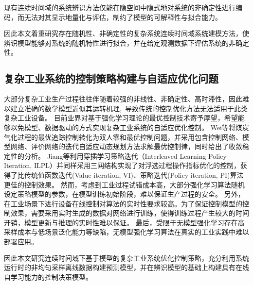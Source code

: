 现有连续时间域的系统辨识方法仅能在隐空间中隐式地对系统的非确定性进行编码，而无法对其显示地量化与评估，制约了模型的可解释性与拟合能力。

因此本文着重研究存在随机性、非确定性的复杂系统连续时间域系统建模方法，使辨识模型能够对系统的随机特性进行拟合，并在给定观测数据下评估系统的非确定性。

\subsection{复杂工业系统的控制策略构建与自适应优化问题}
大部分复杂工业生产过程往往伴随着较强的非线性、非确定性、高时滞性，因此难以建立准确的数学模型近似其运转机理, 导致传统的控制优化方法无法适用于此类复杂工业设备。
目前业界对基于强化学习理论的最优控制技术\cite{Sutton2018}\cite{F.L.LewisD.Vrabie2012}寄予厚望，希望能够以免模型、数据驱动的方式实现复杂工业系统的自适应优化控制。
Wei等\cite{Wei2014}将煤炭气化过程的最优追踪控制转化为双人零和最优控制问题，并采用包含控制网络、模型网络、评价网络的迭代自适应动态规划方法求解最优控制律，同时给出了收敛稳定性的分析。
Jiang等\cite{Jiang2018}利用穿插学习策略迭代（Interleaved Learning
Policy Iteration, ILPL）并同样采用三网结构实现了对浮选过程操作指标优化的控制，获得了比传统值函数迭代(Value iteration, VI)、策略迭代(Policy iteration, PI)算法更佳的控制效果。
然而，考虑到工业过程试错成本高，大部分强化学习算法随机设定策略模型的参数，在模型训练初始阶段，难以保证生产过程的安全。
另外，在工业场景下进行设备在线控制对算法的实时性要求较高。为了保证控制模型的控制效果，需要采用实时生成的数据对网络进行训练，使得训练过程产生较大的时间开销，模型更新与推理的实时性难以保证。
最后，受限于无模型强化学习存在高采样成本与低场景泛化能力等缺陷，无模型强化学习算法在真实的工业实践中难以部署应用。

因此本文研究连续时间域下基于模型的复杂工业系统优化控制策略，充分利用系统运行时的非均匀采样离线数据构建预测模型，并在辨识模型的基础上构建具有在线自学习能力的控制决策模型。

